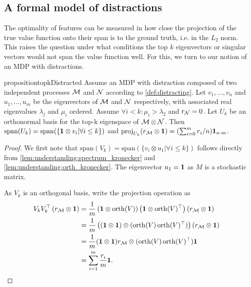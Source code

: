 \subsection{A formal model of distractions}
\label{app:distraction_motivation}

The optimality of features can be measured in how close the projection of the true value function onto their span is to the ground truth, i.e. in the $L_2$ norm.
This raises the question under what conditions the top $k$ eigenvectors or singular vectors would not span the value function well.
For this, we turn to our notion of an MDP with distractions.

\begin{restatable}{proposition}{topkDistracted} \label{prop:SubptimalTopKProduct} Assume an MDP with distraction composed of two independent processes ${\mathcal{M}}$ and ${\mathcal{N}}$ according to \cref{def:distracting}.
Let $v_1,\dots,v_n$ and $u_1,\dots,u_m$ be the eigenvectors of ${\mathcal{M}}$ and ${\mathcal{N}}$ respectively, with associated real eigenvalues $\lambda_j$ and $\mu_i$ ordered.
Assume $\forall i < k: \mu_i > \lambda_2$ and $r_{\mathcal{N}} = 0$.
Let $U_k$ be an orthonormal basis for the top-k eigenspace of ${\mathcal{M}} \otimes {\mathcal{N}}$.
Then $\mathrm{span}(U_k) = \mathrm{span}(\{{\bm{1}} \otimes v_i|\forall i \leq k\})$ and $\mathrm{proj}_{U_k}(r_{\mathcal{M}} \otimes {\bm{1}}) = (\sum_{i=0}^m r_i / n) {\bm{1}}_{n\cdot m}$.
\end{restatable}
\begin{proof}
We first note that $\mathrm{span}(V_k) = \mathrm{span}(\{v_i\otimes u_1|\forall i \leq k\})$ follows directly from \autoref{lem:understanding:spectrum_kronecker} and \autoref{lem:understanding:orth_kronecker}. The eigenvector $u_1 = {\bm{1}}$ as $M$ is a stochastic matrix.

As $V_k$ is an orthogonal basis, write the projection operation as 
\begin{align*}
V_k V_k^\top \left(r_{\mathcal{M}} \otimes {\bm{1}}\right) &= \frac{1}{m}\left({\bm{1}} \otimes \mathrm{orth}(V)\right)\left({\bm{1}} \otimes \mathrm{orth}(V)^\top \right)\left(r_{\mathcal{M}} \otimes {\bm{1}}\right) \\
&= \frac{1}{m}\left(({\bm{1}} \otimes {\bm{1}}) \otimes (\mathrm{orth}(V)\,\mathrm{orth}(V)^\top)\right) (r_{\mathcal{M}} \otimes {\bm{1}})\\
&= \frac{1}{m}({\bm{1}} \otimes {\bm{1}}) r_{\mathcal{M}} \otimes (\mathrm{orth}(V)\,\mathrm{orth}(V)^\top) {\bm{1}} \\
&= \sum_{i=1}^m \frac{r_i}{m}{\bm{1}}.
\end{align*}

\end{proof}


